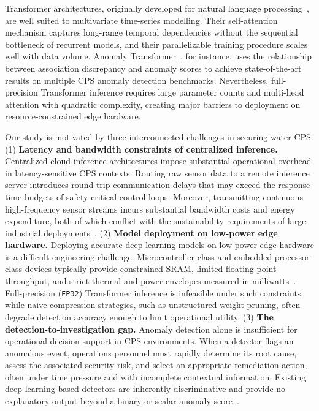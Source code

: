 \documentclass[pdflatex,sn-mathphys-num]{sn-jnl}
\theoremstyle{thmstyleone}
\theoremstyle{thmstyletwo}
\theoremstyle{thmstylethree}
\begin{document}
Transformer architectures, originally developed for natural language processing~\cite{vaswani2017attention}, are well suited to multivariate time-series modelling. Their self-attention mechanism captures long-range temporal dependencies without the sequential bottleneck of recurrent models, and their parallelizable training procedure scales well with data volume. Anomaly Transformer~\cite{xu2022anomaly}, for instance, uses the relationship between association discrepancy and anomaly scores to achieve state-of-the-art results on multiple CPS anomaly detection benchmarks. Nevertheless, full-precision Transformer inference requires large parameter counts and multi-head attention with quadratic complexity, creating major barriers to deployment on resource-constrained edge hardware.


Our study is motivated by three interconnected challenges in securing water CPS:
(1) \textbf{Latency and bandwidth constraints of centralized inference.} Centralized cloud inference architectures impose substantial operational overhead in latency-sensitive CPS contexts. Routing raw sensor data to a remote inference server introduces round-trip communication delays that may exceed the response-time budgets of safety-critical control loops.
Moreover, transmitting continuous high-frequency sensor streams incurs substantial bandwidth costs and energy expenditure, both of which conflict with the sustainability requirements of large industrial deployments~\cite{shi2016edge,bonomi2012fog}.
(2) \textbf{Model deployment on low-power edge hardware.} Deploying accurate deep learning models on low-power edge hardware is a difficult engineering challenge. Microcontroller-class and embedded processor-class devices typically provide constrained SRAM, limited floating-point throughput, and strict thermal and power envelopes measured in milliwatts~\cite{warden2019tinyml}. Full-precision (\texttt{FP32}) Transformer inference is infeasible under such constraints, while naive compression strategies, such as unstructured weight pruning, often degrade detection accuracy enough to limit operational utility.
(3) \textbf{The detection-to-investigation gap.} Anomaly detection alone is insufficient for operational decision support in CPS environments. When a detector flags an anomalous event, operations personnel must rapidly determine its root cause, assess the associated security risk, and select an appropriate remediation action, often under time pressure and with incomplete contextual
information. Existing deep learning-based detectors are inherently discriminative and provide no explanatory output beyond a binary or scalar anomaly score~\cite{chalapathy2019deep}.
\end{document}
